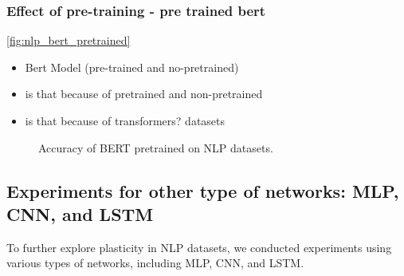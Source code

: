 \subsubsection{Effect of pre-training - pre trained bert}
\autoref{fig:nlp_bert_pretrained}
\begin{itemize}
    \item Bert Model (pre-trained and no-pretrained)
    \item is that because of pretrained and non-pretrained
    \item is that because of transformers?
    datasets %
\end{itemize}


\begin{figure}[htb!]
    \centering
    \caption{Accuracy of BERT pretrained on NLP datasets.}
    \label{fig:nlp_bert_pretrained}
\end{figure}



\subsection{Experiments for other type of networks: MLP, CNN, and LSTM}

To further explore plasticity in NLP datasets, we conducted experiments using various types of networks, including MLP, CNN, and LSTM. 


